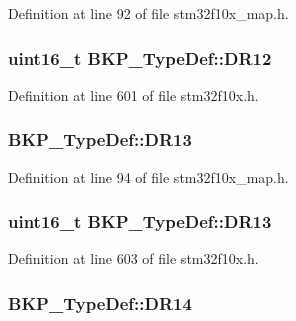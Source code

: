 Definition at line 92 of file stm32f10x\+\_\+map.\+h.

\subsubsection[{\texorpdfstring{D\+R12}{DR12}}]{ {\bf uint16\+\_\+t} B\+K\+P\+\_\+\+Type\+Def\+::\+D\+R12}\hypertarget{struct_b_k_p___type_def_ab41da40ac09242ce3e9779e1634048be}{}\label{struct_b_k_p___type_def_ab41da40ac09242ce3e9779e1634048be}


Definition at line 601 of file stm32f10x.\+h.

\subsubsection[{\texorpdfstring{D\+R13}{DR13}}]{ B\+K\+P\+\_\+\+Type\+Def\+::\+D\+R13}\hypertarget{struct_b_k_p___type_def_af83d1e72ca6d43a2ad4bace213dfe929}{}\label{struct_b_k_p___type_def_af83d1e72ca6d43a2ad4bace213dfe929}


Definition at line 94 of file stm32f10x\+\_\+map.\+h.

\subsubsection[{\texorpdfstring{D\+R13}{DR13}}]{ {\bf uint16\+\_\+t} B\+K\+P\+\_\+\+Type\+Def\+::\+D\+R13}\hypertarget{struct_b_k_p___type_def_a0ab16642a837425a410058ce4295b208}{}\label{struct_b_k_p___type_def_a0ab16642a837425a410058ce4295b208}


Definition at line 603 of file stm32f10x.\+h.

\subsubsection[{\texorpdfstring{D\+R14}{DR14}}]{ B\+K\+P\+\_\+\+Type\+Def\+::\+D\+R14}\hypertarget{struct_b_k_p___type_def_aadd802b771d13f16d25cc56f77c8a4ae}{}\label{struct_b_k_p___type_def_aadd802b771d13f16d25cc56f77c8a4ae}


